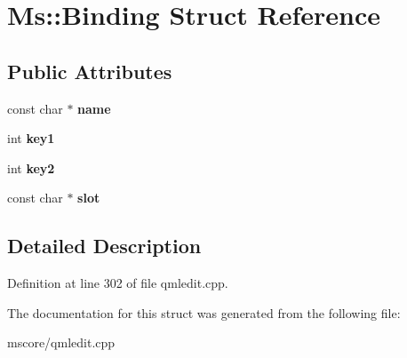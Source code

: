 \hypertarget{struct_ms_1_1_binding}{}\section{Ms\+:\+:Binding Struct Reference}
\label{struct_ms_1_1_binding}
\subsection*{Public Attributes}
\begin{DoxyCompactItemize}
\item 
\mbox{\label{struct_ms_1_1_binding_ade671f35fb926dc2d6208b3b8eee063a}} 
const char $\ast$ {\bfseries name}
\item 
\mbox{\label{struct_ms_1_1_binding_a0d901f158044b0da01d1791295af06c7}} 
int {\bfseries key1}
\item 
\mbox{\label{struct_ms_1_1_binding_a7afe56420e27d6efd5a44c67165da64a}} 
int {\bfseries key2}
\item 
\mbox{\label{struct_ms_1_1_binding_afaea953ae278bddc049d458f0a56fb5d}} 
const char $\ast$ {\bfseries slot}
\end{DoxyCompactItemize}


\subsection{Detailed Description}


Definition at line 302 of file qmledit.\+cpp.



The documentation for this struct was generated from the following file\+:\begin{DoxyCompactItemize}
\item 
mscore/qmledit.\+cpp\end{DoxyCompactItemize}
